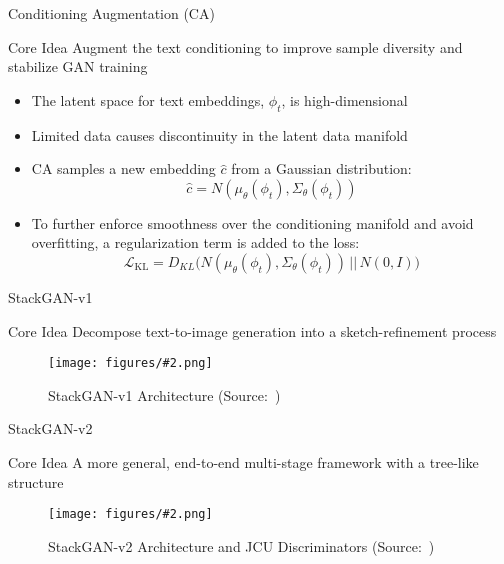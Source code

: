 \documentclass{beamer}
\newcommand{\paperfigure}[3][width=\textwidth]{%
    \begin{figure}%
        \centering%
        \texttt{[image: figures/\#2.png]}%
        \caption{#3 (Source:~\cite{stackgan++})}%
    \end{figure}%
}
\begin{document}
\begin{frame}{Conditioning Augmentation (CA)}
    \centering
    \begin{minipage}{0.8\textwidth}
        \begin{block}{Core Idea}
            \centering
            Augment the text conditioning to improve sample diversity and stabilize GAN training
        \end{block}
    \end{minipage}
    \vspace{1em}
    \begin{itemize}
        \item The latent space for text embeddings, $\phi_t$, is high-dimensional
        \item Limited data causes discontinuity in the latent data manifold
        \item CA samples a new embedding $\hat{c}$ from a Gaussian distribution:
        \[
        \hat{c} = N(\mu_\theta(\phi_t), \Sigma_\theta(\phi_t))
        \]
        \item To further enforce smoothness over the conditioning manifold and avoid overﬁtting, a regularization term is added to the loss:
        \[
        \mathcal{L}_{\text{KL}} = D_{KL}\big(N(\mu_\theta(\phi_t), \Sigma_\theta(\phi_t))\, ||\, N(0, I)\big)
        \]
    \end{itemize}  
\end{frame}

\begin{frame}{StackGAN-v1}
    \centering
    \begin{minipage}{0.8\textwidth}
        \begin{block}{Core Idea}
            \centering
            Decompose text-to-image generation into a sketch-refinement process
        \end{block}
    \end{minipage}
    \paperfigure[width=0.9\textwidth]{stackgan_v1}{StackGAN-v1 Architecture}
\end{frame}


\begin{frame}{StackGAN-v2}
    \centering
    \begin{minipage}{0.8\textwidth}
        \begin{block}{Core Idea}
            \centering
            A more general, end-to-end multi-stage framework with a tree-like structure
        \end{block}
    \end{minipage}
    \paperfigure[width=0.9\textwidth]{stackgan_v2}{StackGAN-v2 Architecture and JCU Discriminators}
\end{frame}
\end{document}
